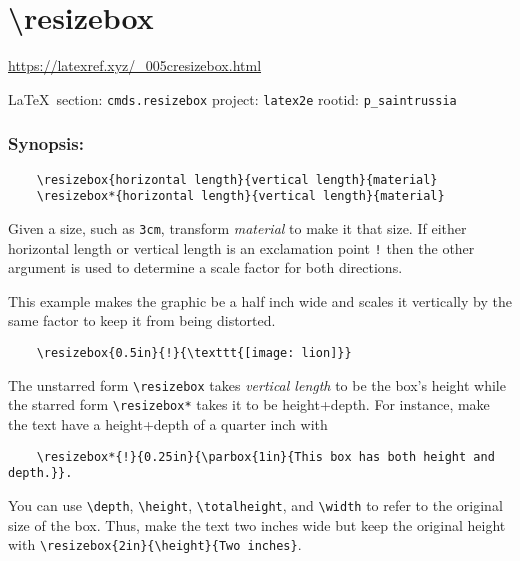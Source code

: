  
 
\section{\textbackslash resizebox}
\url{https://latexref.xyz/_005cresizebox.html}
  
\vspace{0.5cm}
 {\ifDEBUG\small\LaTeX~section: \verb|cmds.resizebox| project: \verb|latex2e| rootid: \verb|p_saintrussia| \fi}
\vspace{0.5cm}

\subsubsection{Synopsis:}

\begin{verbatim}
	\resizebox{horizontal length}{vertical length}{material}
	\resizebox*{horizontal length}{vertical length}{material}
\end{verbatim}

Given a size, such as \verb|3cm|, transform \emph{material} to make it that size. If either
horizontal length or vertical length is an exclamation point \verb|!| then the other
argument is used to determine a scale factor for both directions.

This example makes the graphic be a half inch wide and scales it vertically by
the same factor to keep it from being distorted.

\begin{verbatim}
	\resizebox{0.5in}{!}{\texttt{[image: lion]}}
\end{verbatim}

The unstarred form \verb|\resizebox| takes \emph{vertical length} to be the box’s height
while the starred form \verb|\resizebox*| takes it to be height+depth. For instance,
make the text have a height+depth of a quarter inch with

\begin{verbatim}
	\resizebox*{!}{0.25in}{\parbox{1in}{This box has both height and depth.}}.
\end{verbatim}

You can use \verb|\depth|, \verb|\height|, \verb|\totalheight|, and
\verb|\width| to refer to the original size of the box. Thus, make the text two
inches wide but keep the original height with
\verb|\resizebox{2in}{\height}{Two inches}|. 
  
